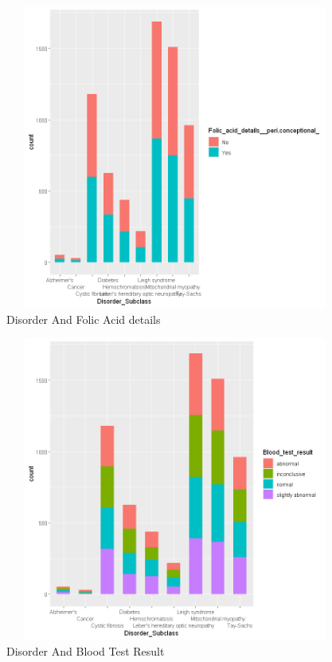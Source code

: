 \begin{figure}[htpb]
	\centering
	\includegraphics[height=10cm, width=12cm]{figures/folicacid.png}
	\caption{Disorder And Folic Acid details}
	\label{fig 9}
\end{figure}

\begin{figure}[htpb]
	\centering
	\includegraphics[height=10cm, width=12cm]{figures/Blood.png}
	\caption{Disorder And Blood Test Result}
	\label{fig 10}
\end{figure}

